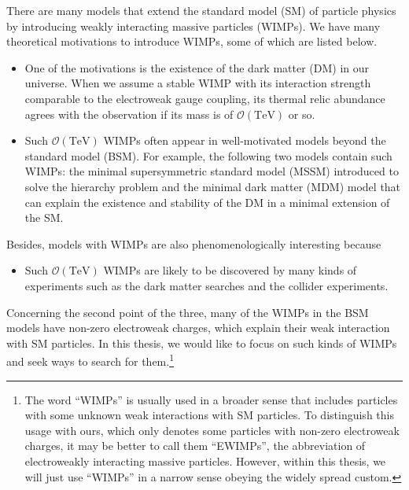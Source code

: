 \documentclass[12pt,twoside,book]{article}
\begin{document}
There are many models that extend the standard model (SM) of particle physics by introducing weakly interacting massive particles (WIMPs).
We have many theoretical motivations to introduce WIMPs, some of which are listed below.
\begin{itemize}
  \item
    One of the motivations is the existence of the dark matter (DM) in our universe.
    When we assume a stable WIMP with its interaction strength comparable to the electroweak gauge coupling, its thermal relic abundance agrees with the observation if its mass is of $\mathcal{O}(\mathrm{TeV})$ or so.
  \item
    Such $\mathcal{O}(\mathrm{TeV})$ WIMPs often appear in well-motivated models beyond the standard model (BSM).
    For example, the following two models contain such WIMPs: the minimal supersymmetric standard model (MSSM) introduced to solve the hierarchy problem and the minimal dark matter (MDM) model that can explain the existence and stability of the DM in a minimal extension of the SM.
\end{itemize}
Besides, models with WIMPs are also phenomenologically interesting because
\begin{itemize}
  \item
    Such $\mathcal{O}(\mathrm{TeV})$ WIMPs are likely to be discovered by many kinds of experiments such as the dark matter searches and the collider experiments.
\end{itemize}
Concerning the second point of the three, many of the WIMPs in the BSM models have non-zero electroweak charges, which explain their weak interaction with SM particles.
In this thesis, we would like to focus on such kinds of WIMPs and seek ways to search for them.\footnote
{
  The word ``WIMPs'' is usually used in a broader sense that includes particles with some unknown weak interactions with SM particles.
  To distinguish this usage with ours, which only denotes some particles with non-zero electroweak charges, it may be better to call them ``EWIMPs'', the abbreviation of electroweakly interacting massive particles.
  However, within this thesis, we will just use ``WIMPs'' in a narrow sense obeying the widely spread custom.
}
\end{document}
